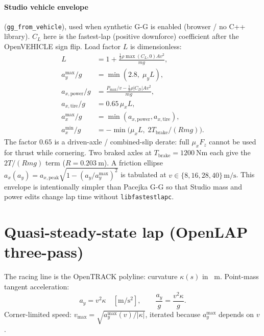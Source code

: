 \documentclass[11pt,letterpaper]{article}
\begin{document}
\paragraph{Studio vehicle envelope} (\texttt{gg\_from\_vehicle}), used
when synthetic G-G is enabled (browser / no C++ library). $C_L$ here is
the fastest-lap (positive downforce) coefficient after the OpenVEHICLE
sign flip. Load factor $L$ is dimensionless:
\begin{align}
  L &= 1 + \frac{\tfrac12\rho \max(C_L,0) A v^2}{m g},\\
  a_y^{\max}/g &= \min(2.8,\; \mu_y L),\\
  a_{x,\mathrm{power}}/g &= \frac{P_{\max}/v - \tfrac12\rho |C_D| A v^2}{m g},\\
  a_{x,\mathrm{tire}}/g &= 0.65\,\mu_x L,\\
  a_x^{\max}/g &= \min(a_{x,\mathrm{power}}, a_{x,\mathrm{tire}}),\\
  a_x^{\min}/g &= -\min\bigl(\mu_x L,\; 2 T_{\mathrm{brake}}/(R m g)\bigr).
\end{align}
The factor $0.65$ is a driven-axle / combined-slip derate: full
$\mu_x F_z$ cannot be used for thrust while cornering. Two braked
axles at $T_{\mathrm{brake}}=\SI{1200}{\newton\metre}$ each give the
$2T/(Rmg)$ term ($R=\SI{0.203}{\metre}$). A friction ellipse
$a_x(a_y) = a_{x,\mathrm{peak}}\sqrt{1-(a_y/a_y^{\max})^2}$ is tabulated
at $v\in\{8,16,28,40\}\,\si{\metre\per\second}$. This envelope is
intentionally simpler than Pacejka G-G so that Studio mass and power
edits change lap time without \texttt{libfastestlapc}.

\section{Quasi-steady-state lap (OpenLAP three-pass)}
\label{sec:qss}

The racing line is the OpenTRACK polyline: curvature $\kappa(s)$ in
\si{\per\metre}. Point-mass tangent acceleration:
\begin{equation}
  a_y = v^2 \kappa \quad [\si{\metre\per\second\squared}],\qquad
  \frac{a_y}{g} = \frac{v^2\kappa}{g}.
  \label{eq:ay}
\end{equation}
Corner-limited speed: $v_{\max}=\sqrt{a_y^{\max}(v)/|\kappa|}$, iterated
because $a_y^{\max}$ depends on $v$.
\end{document}
